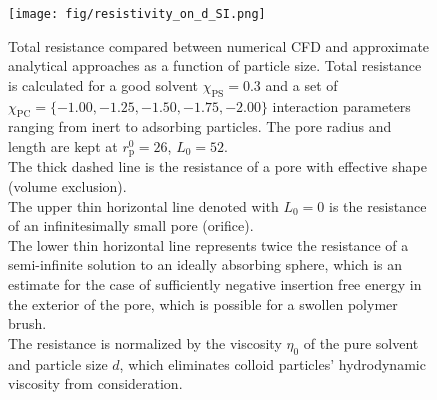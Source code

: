 \documentclass[10pt, a4paper]{article}
\begin{document}
\begin{multicols}{2}
\begin{figure}[H]
    \centering
    \texttt{[image: fig/resistivity\_on\_d\_SI.png]}
    \caption{
        Total resistance compared between numerical CFD and approximate analytical approaches as a function of particle size.
        Total resistance is calculated for a good solvent $\chi_{\text{PS}} = 0.3$ and a set of $\chi_{\text{PC}} = \{-1.00, -1.25, -1.50, -1.75, -2.00\}$ interaction parameters ranging from inert to adsorbing particles.
        The pore radius and length are kept at $r_{\text{p}}^{0} = 26$, $L_{0} = 52$.
        \\
        The thick dashed line is the resistance of a pore with effective shape (volume exclusion).
        \\
        The upper thin horizontal line denoted with $L_{0} = 0$ is the resistance of an infinitesimally small pore (orifice).
        \\
        The lower thin horizontal line represents twice the resistance of a semi-infinite solution to an ideally absorbing sphere, which is an estimate for the case of sufficiently negative insertion free energy in the exterior of the pore, which is possible for a swollen polymer brush.
        \\
        The resistance is normalized by the viscosity $\eta_{0}$ of the pure solvent and particle size $d$, which eliminates colloid particles' hydrodynamic viscosity from consideration.
        }
    \label{fig:CFD_comparison}
\end{figure}


\end{multicols}
    

\end{document}
